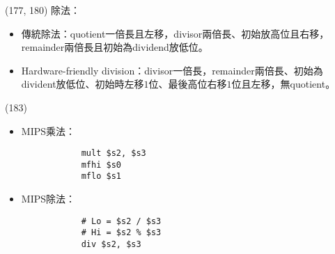 \item \begin{theorem}{(177, 180)} 除法：\begin{itemize}
        \item 傳統除法：quotient一倍長且左移，divisor兩倍長、初始放高位且右移，remainder兩倍長且初始為dividend放低位。
        \item Hardware-friendly division：divisor一倍長，remainder兩倍長、初始為divident放低位、初始時左移$1$位、最後高位右移$1$位且左移，無quotient。
    \end{itemize}
\end{theorem}

\item \begin{theorem}{(183)} \quad\quad \begin{itemize}
        \item MIPS乘法：\begin{lstlisting}
            mult $s2, $s3
            mfhi $s0
            mflo $s1
        \end{lstlisting} 
        \item MIPS除法：\begin{lstlisting}
            # Lo = $s2 / $s3
            # Hi = $s2 % $s3
            div $s2, $s3
        \end{lstlisting}
    \end{itemize}
\end{theorem}

